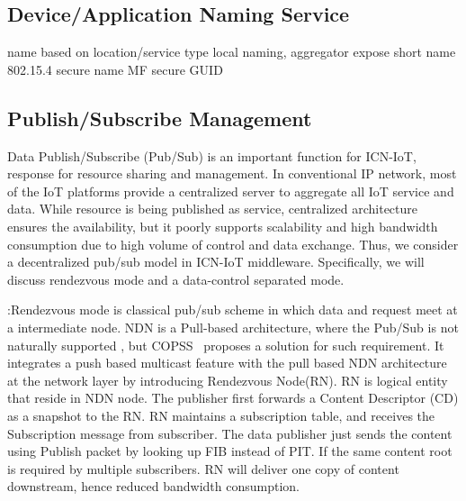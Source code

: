\subsection{Device/Application Naming Service}

name based on location/service type
local naming, aggregator expose short name
802.15.4 secure name MF secure GUID
\subsection{Publish/Subscribe Management}
Data Publish/Subscribe (Pub/Sub) is an important function for ICN-IoT, response for resource sharing and management. In conventional IP network, most of the IoT platforms provide a centralized server to aggregate all IoT service and data. While resource is being published as service,  centralized architecture ensures the availability, but it poorly supports scalability and high bandwidth consumption due to high volume of control and data exchange. Thus, we consider a decentralized pub/sub model in ICN-IoT middleware. Specifically, we will discuss rendezvous mode and a data-control separated mode.

\vspace{1mm}:Rendezvous mode is classical pub/sub scheme in which data and request meet at a intermediate node. NDN is a Pull-based architecture, where the Pub/Sub is not naturally supported , but COPSS~\cite{**copss paper**} proposes a solution for such requirement. It integrates a push based multicast feature with the pull based NDN architecture at the network layer by introducing Rendezvous Node(RN). RN is logical entity that reside in NDN node. The publisher first forwards a Content Descriptor (CD) as a snapshot to the RN. RN maintains a subscription table, and receives the Subscription message from subscriber. The data publisher just sends the content using Publish packet by looking up FIB instead of PIT. If the same content root is required by multiple subscribers. RN will deliver one copy  of content downstream, hence reduced bandwidth consumption.

